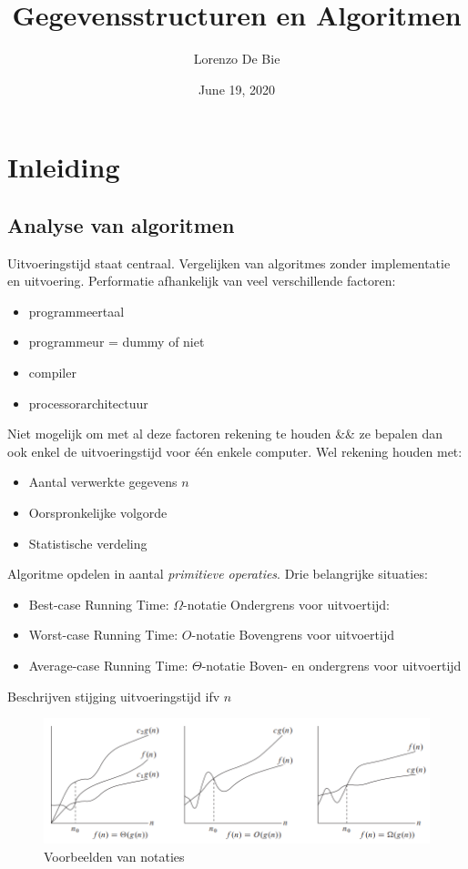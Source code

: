 \documentclass{article}
\author{Lorenzo De Bie}
\title{Gegevensstructuren en Algoritmen}
\date{June 19, 2020}
\begin{document}
\maketitle

\tableofcontents

\newpage

\section{Inleiding\label{inleiding}}
\subsection{Analyse van algoritmen}
Uitvoeringstijd staat centraal. Vergelijken van algoritmes zonder implementatie en uitvoering.
Performatie afhankelijk van veel verschillende factoren:
\begin{itshape}
	\begin{itemize}
		\item programmeertaal
		\item programmeur = dummy of niet
		\item compiler
		\item processorarchitectuur
	\end{itemize}
\end{itshape}
Niet mogelijk om met al deze factoren rekening te houden \&\& ze bepalen dan ook enkel de uitvoeringstijd voor één enkele computer. Wel rekening houden met:
\begin{itemize}
 	\item Aantal verwerkte gegevens $n$
 	\item Oorspronkelijke volgorde
 	\item Statistische verdeling
\end{itemize}
Algoritme opdelen in aantal \textit{primitieve operaties}. Drie belangrijke situaties:
\begin{itemize}
	\item Best-case Running Time: $\Omega$-notatie\newline
	Ondergrens voor uitvoertijd:
	\item Worst-case Running Time: $O$-notatie\newline
	Bovengrens voor uitvoertijd
	\item Average-case Running Time: $\Theta$-notatie\newline
	Boven- en ondergrens voor uitvoertijd
\end{itemize}
Beschrijven stijging uitvoeringstijd ifv $n$
\begin{figure}[h]
	\centering
	\includegraphics[width=\textwidth]{Growth_of_functions}
	\caption{Voorbeelden van notaties}
	\label{fig:figure1}
\end{figure}
\end{document}
